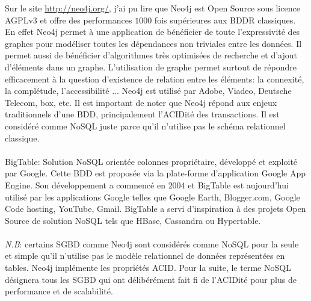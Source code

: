 Sur le site \url{http://neo4j.org/}, j'ai pu lire que \textsf{Neo4j}
est \textsf{Open Source} sous licence \textsf{AGPLv3} et offre des
performances $1000$ fois supérieures aux \textsf{BDDR} classiques. En
effet \textsf{Neo4j} permet à une application de bénéficier de toute
l'expressivité des graphes pour modéliser toutes les dépendances non
triviales entre les données. Il permet aussi de bénéficier
d'algorithmes très optimisées de recherche et d'ajout d'éléments dans
un graphe. L'utilisation de graphe permet surtout de répondre
efficacement à la question d'existence de relation entre les éléments:
la connexité, la complétude, l'accessibilité ... \textsf{Neo4j} est
utilisé par \textsf{Adobe, Viadeo, Deutsche Telecom, box,
etc}\cite{neo4jClients}. 
Il est important de noter que \textsf{Neo4j} répond aux enjeux traditionnels 
d'une \textsf{BDD}, principalement l'\textsf{ACIDité} des transactions. 
Il est considéré comme \textsf{NoSQL} juste parce qu'il n'utilise
pas le schéma relationnel classique.
\\
\\
\textsf{BigTable}:  Solution \textsf{NoSQL} orientée 
\textsf{colonnes} propriétaire, développé et exploité par Google. Cette 
\textsf{BDD} est proposée via la plate-forme d'application 
\textsf{Google App Engine}. Son
développement a commencé en $2004$ et \textsf{BigTable} est aujourd'hui 
utilisé par les
applications \textsf{Google} telles que \textsf{Google Earth},
\textsf{Blogger.com}, \textsf{Google Code hosting}, \textsf{YouTube},
\textsf{Gmail}. \textsf{BigTable} a servi d'inspiration à des projets 
\textsf{Open Source} de solution \textsf{NoSQL} tels que \textsf{HBase},
\textsf{Cassandra} ou \textsf{Hypertable}\cite{RickCattell}.
\\
\\
\textit{N.B}: certains \textsf{SGBD} comme \textsf{Neo4j} sont considérés comme \textsf{NoSQL} pour la seule et simple qu'il n'utilise
pas le modèle relationnel de données représentées en tables. \textsf{Neo4j} implémente les propriétés \textsf{ACID}. Pour la suite, le terme 
\textsf{NoSQL} désignera tous les \textsf{SGBD} qui ont délibérément fait fi de l'\textsf{ACIDité} pour plus de performance et de scalabilité.  
